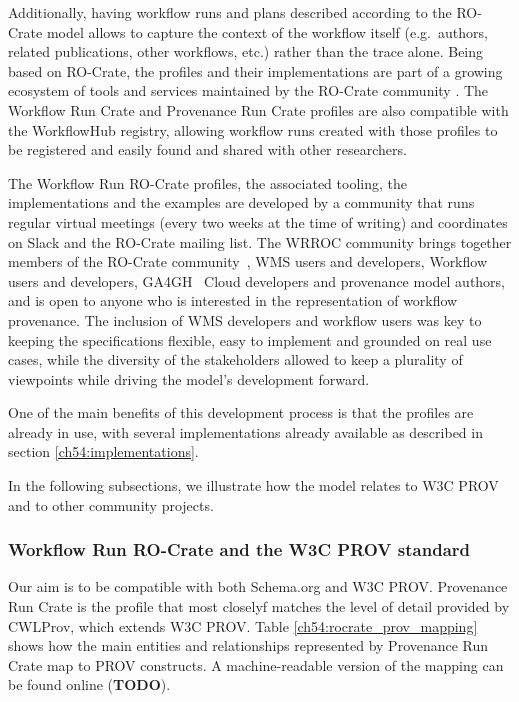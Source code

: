 Additionally, having workflow runs and plans described according to the RO-Crate model allows to capture the context of the workflow itself (e.g.~authors, related publications, other workflows, etc.) rather than the trace alone. 
Being based on RO-Crate, the profiles and their implementations are part of a growing ecosystem of tools and services maintained by the RO-Crate community .
The Workflow Run Crate and Provenance Run Crate profiles are also compatible with the WorkflowHub registry, allowing workflow runs created with those profiles to be registered and easily found and shared with other researchers.

The Workflow Run RO-Crate profiles, the associated tooling, the implementations and the examples are developed by a community that runs regular virtual meetings (every two weeks at the time of writing) and coordinates on Slack and the RO-Crate mailing list.
The WRROC community brings together members of the RO-Crate community~\cite{Soiland-Reyes 2022}, WMS users and developers, Workflow users and developers, GA4GH~\cite{Rehm 2021} Cloud developers and provenance model authors, and is open to anyone who is interested in the representation of workflow provenance.
The inclusion of WMS developers and workflow users was key to keeping the specifications flexible, easy to implement and grounded on real use cases, while the diversity of the stakeholders allowed to keep a plurality of viewpoints while driving the model's development forward.

One of the main benefits of this development process is that the profiles are already in use, with several implementations already available as described in section \vref{ch54:implementations}.

In the following subsections, we illustrate how the model relates to W3C PROV and to other community projects.

\subsubsection{Workflow Run RO-Crate and the W3C PROV standard}

Our aim is to be compatible with both Schema.org and W3C PROV. Provenance Run Crate is the profile that most closelyf matches the level of detail provided by CWLProv, which extends W3C PROV. Table \vref{ch54:rocrate_prov_mapping} shows how the main entities and relationships represented by Provenance Run Crate map to PROV constructs. A machine-readable version of the mapping can be found online (\textbf{TODO}).

